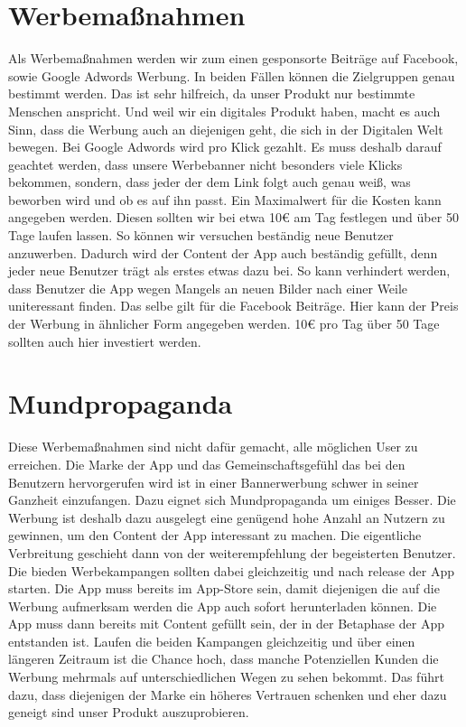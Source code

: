 \section{Werbemaßnahmen}

Als Werbemaßnahmen werden wir zum einen gesponsorte Beiträge auf Facebook, sowie Google Adwords Werbung. In beiden Fällen können die Zielgruppen genau bestimmt werden. Das ist sehr hilfreich, da unser Produkt nur bestimmte Menschen anspricht. Und weil wir ein digitales Produkt haben, macht es auch Sinn, dass die Werbung auch an diejenigen geht, die sich in der Digitalen Welt bewegen.
Bei Google Adwords wird pro Klick gezahlt. Es muss deshalb darauf geachtet werden, dass unsere Werbebanner nicht besonders viele Klicks bekommen, sondern, dass jeder der dem Link folgt auch genau weiß, was beworben wird und ob es auf ihn passt. Ein Maximalwert für die Kosten kann angegeben werden. Diesen sollten wir bei etwa 10€ am Tag festlegen und über 50 Tage laufen lassen. So können wir versuchen beständig neue Benutzer anzuwerben. Dadurch wird der Content der App auch beständig gefüllt, denn jeder neue Benutzer trägt als erstes etwas dazu bei. So kann verhindert werden, dass Benutzer die App wegen Mangels an neuen Bilder nach einer Weile uniteressant finden.
Das selbe gilt für die Facebook Beiträge. Hier kann der Preis der Werbung in ähnlicher Form angegeben werden. 10€ pro Tag über 50 Tage sollten auch hier investiert werden.

\section{Mundpropaganda}

Diese Werbemaßnahmen sind nicht dafür gemacht, alle möglichen User zu erreichen. Die Marke der App und das Gemeinschaftsgefühl das bei den Benutzern hervorgerufen wird ist in einer Bannerwerbung schwer in seiner Ganzheit einzufangen. Dazu eignet sich Mundpropaganda um einiges Besser. Die Werbung ist deshalb dazu ausgelegt eine genügend hohe Anzahl an Nutzern zu gewinnen, um den Content der App interessant zu machen. Die eigentliche Verbreitung geschieht dann von der weiterempfehlung der begeisterten Benutzer.
Die bieden Werbekampangen sollten dabei gleichzeitig und nach release der App starten. Die App muss bereits im App-Store sein, damit diejenigen die auf die Werbung aufmerksam werden die App auch sofort herunterladen können. Die App muss dann bereits mit Content gefüllt sein, der in der Betaphase der App entstanden ist. Laufen die beiden Kampangen gleichzeitig und über einen längeren Zeitraum ist die Chance hoch, dass manche Potenziellen Kunden die Werbung mehrmals auf unterschiedlichen Wegen zu sehen bekommt. Das führt dazu, dass diejenigen der Marke ein höheres Vertrauen schenken und eher dazu geneigt sind unser Produkt auszuprobieren.
